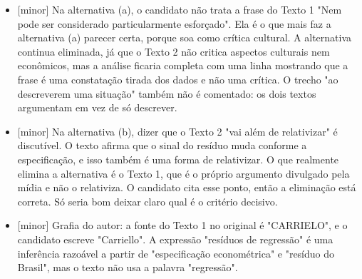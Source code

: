 \documentclass{article}%
\begin{document}
\begin{itemize}%
\item%
{[}minor{]} Na alternativa (a), o candidato não trata a frase do Texto 1 "Nem pode ser considerado particularmente esforçado". Ela é o que mais faz a alternativa (a) parecer certa, porque soa como crítica cultural. A alternativa continua eliminada, já que o Texto 2 não critica aspectos culturais nem econômicos, mas a análise ficaria completa com uma linha mostrando que a frase é uma constatação tirada dos dados e não uma crítica. O trecho "ao descreverem uma situação" também não é comentado: os dois textos argumentam em vez de só descrever.%
\item%
{[}minor{]} Na alternativa (b), dizer que o Texto 2 "vai além de relativizar" é discutível. O texto afirma que o sinal do resíduo muda conforme a especificação, e isso também é uma forma de relativizar. O que realmente elimina a alternativa é o Texto 1, que é o próprio argumento divulgado pela mídia e não o relativiza. O candidato cita esse ponto, então a eliminação está correta. Só seria bom deixar claro qual é o critério decisivo.%
\item%
{[}minor{]} Grafia do autor: a fonte do Texto 1 no original é "CARRIELO", e o candidato escreve "Carriello". A expressão "resíduos de regressão" é uma inferência razoável a partir de "especificação econométrica" e "resíduo do Brasil", mas o texto não usa a palavra "regressão".%
\end{itemize}%
\end{document}
